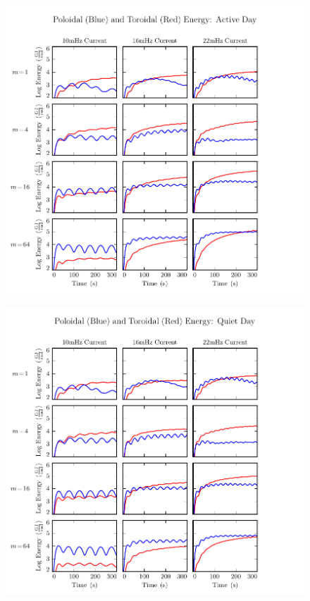 \begin{figure}[H]
    \centering
    \includegraphics[width=\textwidth]{figures/UP_UT_J_1.pdf}
    \caption[Current-Driven Poloidal and Toroidal Energy: Active Day]{}
    \label{fig_UP_UT_J_1}
\end{figure}

\begin{figure}[H]
    \centering
    \includegraphics[width=\textwidth]{figures/UP_UT_J_2.pdf}
    \caption[Current-Driven Poloidal and Toroidal Energy: Quiet Day]{}
    \label{fig_UP_UT_J_2}
\end{figure}

